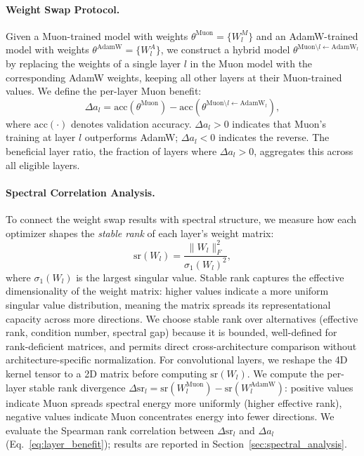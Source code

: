 \paragraph{Weight Swap Protocol.}
Given a Muon-trained model with weights $\theta^{\text{Muon}} = \{W_l^M\}$ and an AdamW-trained model with weights $\theta^{\text{AdamW}} = \{W_l^A\}$, we construct a hybrid model $\theta^{\text{Muon} \setminus l \leftarrow \text{AdamW}_l}$ by replacing the weights of a single layer $l$ in the Muon model with the corresponding AdamW weights, keeping all other layers at their Muon-trained values.
We define the per-layer Muon benefit:
\begin{equation}
    \Delta a_l = \mathrm{acc}(\theta^{\text{Muon}}) - \mathrm{acc}(\theta^{\text{Muon} \setminus l \leftarrow \text{AdamW}_l}),
    \label{eq:layer_benefit}
\end{equation}
where $\mathrm{acc}(\cdot)$ denotes validation accuracy.
$\Delta a_l > 0$ indicates that Muon's training at layer $l$ outperforms AdamW; $\Delta a_l < 0$ indicates the reverse.
The beneficial layer ratio, the fraction of layers where $\Delta a_l > 0$, aggregates this across all eligible layers.

\paragraph{Spectral Correlation Analysis.}
To connect the weight swap results with spectral structure, we measure how each optimizer shapes the \emph{stable rank} of each layer's weight matrix:
\begin{equation}
    \mathrm{sr}(W_l) = \frac{\|W_l\|_F^2}{\sigma_1(W_l)^2},
    \label{eq:spectral_response}
\end{equation}
where $\sigma_1(W_l)$ is the largest singular value.
Stable rank captures the effective dimensionality of the weight matrix: higher values indicate a more uniform singular value distribution, meaning the matrix spreads its representational capacity across more directions.
We choose stable rank over alternatives (effective rank, condition number, spectral gap) because it is bounded, well-defined for rank-deficient matrices, and permits direct cross-architecture comparison without architecture-specific normalization.
For convolutional layers, we reshape the 4D kernel tensor to a 2D matrix before computing $\mathrm{sr}(W_l)$.
We compute the per-layer stable rank divergence $\Delta \mathrm{sr}_l = \mathrm{sr}(W_l^{\text{Muon}}) - \mathrm{sr}(W_l^{\text{AdamW}})$: positive values indicate Muon spreads spectral energy more uniformly (higher effective rank), negative values indicate Muon concentrates energy into fewer directions.
We evaluate the Spearman rank correlation between $\Delta \mathrm{sr}_l$ and $\Delta a_l$ (Eq.~\ref{eq:layer_benefit}); results are reported in Section~\ref{sec:spectral_analysis}.

